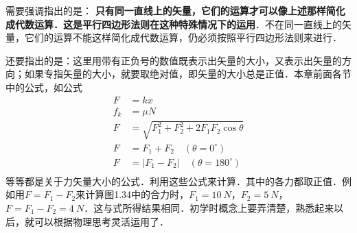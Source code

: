 需要强调指出的是：\textbf{ 只有同一直线上的矢量，它们的运算才可以像上述那样简化成代数运算．这是平行四边形法则在这种特殊情况下的运用}．不在同一直线上的矢量，它们的运算不能这样简化成代数运算，仍必须按照平行四边形法则来进行．



还要指出的是：这里用带有正负号的数值既表示出矢量的大小，又表示出矢量的方向；如果专指矢量的大小，就要取绝对值，即矢量的大小总是正值．本章前面各节中的公式，如公式
\begin{equation*}
    \begin{aligned}
        F   & =kx                                               \\
        f_k & =\mu N                                            \\
        F   & =\sqrt{F^2_1+F^2_2+2F_1F_2\cos\theta}             \\
        F   & =F_1+F_2\quad (\theta =0^\circ)                   \\
        F   & =\left| F_1-F_2 \right| \quad (\theta =180^\circ) \\
    \end{aligned}
\end{equation*}
等等都是关于力矢量大小的公式．利用这些公式来计算．其中的各力都取正值．例如用$F=F_1-F_2$来计算图1.34中的合力时，$F_1=\qty{10}{N}$，$F_2=\qty{5}{N}$，$F=F_1-F_2=\qty{4}{N}$．这与式所得结果相同．初学时概念上要弄清楚，熟悉起来以后，就可以根据物理思考灵活运用了．



